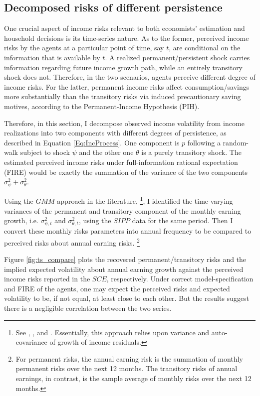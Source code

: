 \hypertarget{decomposed-risks-of-different-nature}{%
\subsection{Decomposed risks of different persistence}\label{dcomposed-risks-of-different-nature}}

One crucial aspect of income risks relevant to both economists' estimation and household decisions is its time-series nature. As to the former, perceived income risks by the agents at a particular point of time, say $t$, are conditional on the information that is available by $t$. A realized permanent/persistent shock carries information regarding future income growth path, while an entirely transitory shock does not. Therefore, in the two scenarios, agents perceive different degree of income risks. For the latter, permanent income risks affect consumption/savings more substantially than the transitory risks via induced precautionary saving motives, according to the Permanent-Income Hypothesis (PIH). 

Therefore, in this section, I decompose observed income volatility from income realizations into two components with different degrees of persistence, as described in Equation \ref{Eq:IncProcess}. One component is $p$ following a random-walk subject to shock $\psi$ and the other one $\theta$ is a purely transitory shock. The estimated perceived income risks under full-information rational expectation (FIRE) would be exactly the summation of the variance of the two components $\sigma^2_{\psi}+\sigma^2_{\theta}$.

Using the $GMM$ approach in the literature, \footnote{See \cite{carroll1997nature}, \cite{meghir2004income}, and \cite{blundell_consumption_2008}. Essentially, this approach relies upon variance and auto-covariance of growth of income residuals.}, I identified the time-varying variances of the permanent and transitory component of the monthly earning growth, i.e. $\sigma^2_{\psi,t}$ and $\sigma^2_{\theta,t}$, using the $SIPP$ data for the same period. Then I convert these monthly risks parameters into annual frequency to be compared to perceived risks about annual earning risks. \footnote{For permanent risks, the annual earning risk is the summation of monthly permanent risks over the next 12 months. The transitory risks of annual earnings, in contrast, is the sample average of monthly risks over the next 12 months.}


Figure \ref{fig:ts_compare} plots the recovered permanent/transitory risks and the implied expected volatility about annual earning growth against the perceived income risks reported in the $SCE$, respectively. Under correct model-specification and FIRE of the agents, one may expect the perceived risks and expected volatility to be, if not equal, at least close to each other. But the results suggest there is a negligible correlation between the two series. 

